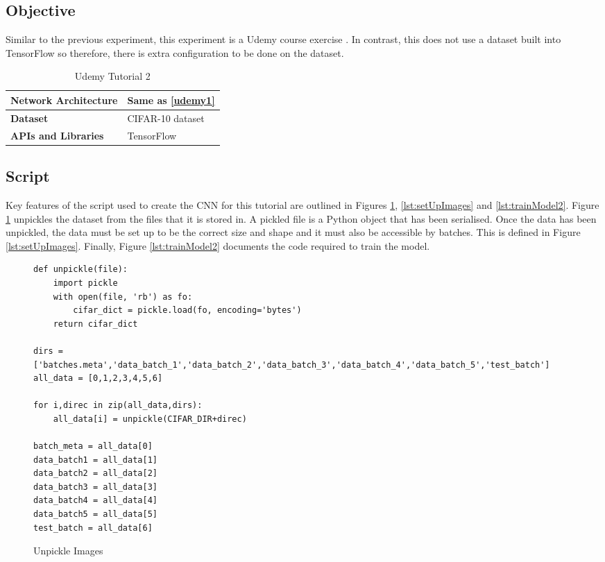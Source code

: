 \tocless\subsection{Objective}
Similar to the previous experiment, this experiment is a Udemy course exercise \parencite{udemy}. In contrast, this does not use a dataset built into TensorFlow so therefore, there is extra configuration to be done on the dataset.

\begin{table}[h]
\centering
\caption{Udemy Tutorial 2}
\label{my-label}
\begin{tabular}{|l|p{8cm}|}
\hline
\textbf{Network Architecture} & Same as \ref{udemy1}            \\ \hline
\textbf{Dataset}              & CIFAR-10 dataset \\ \hline
\textbf{APIs and Libraries}   & TensorFlow                                                         \\ \hline
\end{tabular}
\end{table}

\tocless\subsection{Script}
Key features of the script used to create the CNN for this tutorial are outlined in Figures \ref{lst:unpickle}, \ref{lst:setUpImages} and \ref{lst:trainModel2}.
Figure \ref{lst:unpickle} unpickles the dataset from the files that it is stored in.
A pickled file is a Python object that has been serialised.
Once the data has been unpickled, the data must be set up to be the correct size and shape and it must also be accessible by batches.
This is defined in Figure \ref{lst:setUpImages}.
Finally, Figure \ref{lst:trainModel2} documents the code required to train the model.

\begin{figure}[h]
\caption{Unpickle Images \parencite{udemy}}
\label{lst:unpickle}
\begin{lstlisting}[style=Python]
def unpickle(file):
    import pickle
    with open(file, 'rb') as fo:
        cifar_dict = pickle.load(fo, encoding='bytes')
    return cifar_dict

dirs = ['batches.meta','data_batch_1','data_batch_2','data_batch_3','data_batch_4','data_batch_5','test_batch']
all_data = [0,1,2,3,4,5,6]

for i,direc in zip(all_data,dirs):
    all_data[i] = unpickle(CIFAR_DIR+direc)

batch_meta = all_data[0]
data_batch1 = all_data[1]
data_batch2 = all_data[2]
data_batch3 = all_data[3]
data_batch4 = all_data[4]
data_batch5 = all_data[5]
test_batch = all_data[6]
\end{lstlisting}
\end{figure}

